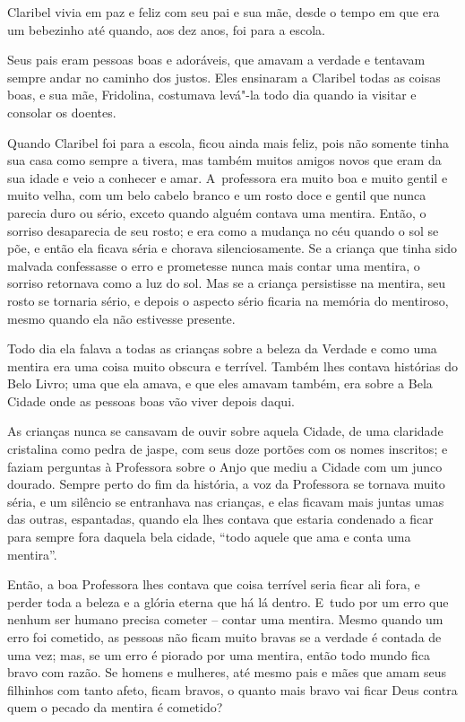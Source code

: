 

Claribel vivia em paz e feliz com seu pai e sua mãe, desde o tempo em
que era um bebezinho até quando, aos dez anos, foi para a escola.

Seus pais eram pessoas boas e adoráveis, que amavam a verdade e tentavam
sempre andar no caminho dos justos. Eles ensinaram a Claribel todas as
coisas boas, e sua mãe, Fridolina, costumava levá"-la todo dia quando ia
visitar e consolar os doentes.

Quando Claribel foi para a escola, ficou ainda mais feliz, pois não
somente tinha sua casa como sempre a tivera, mas também muitos amigos
novos que eram da sua idade e veio a conhecer e amar. A~professora era
muito boa e muito gentil e muito velha, com um belo cabelo branco e um
rosto doce e gentil que nunca parecia duro ou sério, exceto quando
alguém contava uma mentira. Então, o sorriso desaparecia de seu rosto; e
era como a mudança no céu quando o sol se põe, e então ela ficava séria
e chorava silenciosamente. Se a criança que tinha sido malvada
confessasse o erro e prometesse nunca mais contar uma mentira, o sorriso
retornava como a luz do sol. Mas se a criança persistisse na mentira,
seu rosto se tornaria sério, e depois o aspecto sério ficaria na memória
do mentiroso, mesmo quando ela não estivesse presente.

Todo dia ela falava a todas as crianças sobre a beleza da Verdade e como
uma mentira era uma coisa muito obscura e terrível. Também lhes contava
histórias do Belo Livro; uma que ela amava, e que eles amavam também,
era sobre a Bela Cidade onde as pessoas boas vão viver depois daqui.

As crianças nunca se cansavam de ouvir sobre aquela Cidade, de uma
claridade cristalina como pedra de jaspe, com seus doze portões com os
nomes inscritos; e faziam perguntas à Professora sobre o Anjo que mediu
a Cidade com um junco dourado. Sempre perto do fim da história, a voz da
Professora se tornava muito séria, e um silêncio se entranhava nas
crianças, e elas ficavam mais juntas umas das outras, espantadas, quando
ela lhes contava que estaria condenado a ficar para sempre fora daquela
bela cidade, ``todo aquele que ama e conta uma mentira''.

Então, a boa Professora lhes contava que coisa terrível seria ficar ali
fora, e perder toda a beleza e a glória eterna que há lá dentro. E~tudo
por um erro que nenhum ser humano precisa cometer -- contar uma mentira.
Mesmo quando um erro foi cometido, as pessoas não ficam muito bravas se
a verdade é contada de uma vez; mas, se um erro é piorado por uma
mentira, então todo mundo fica bravo com razão. Se homens e mulheres,
até mesmo pais e mães que amam seus filhinhos com tanto afeto, ficam
bravos, o quanto mais bravo vai ficar Deus contra quem o pecado da
mentira é cometido?

